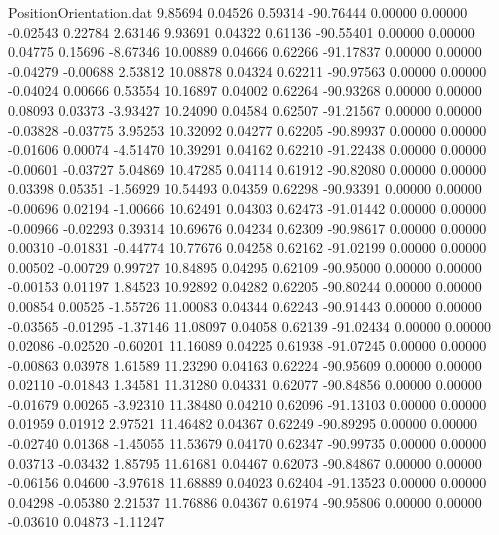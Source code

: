 \begin{filecontents}{PositionOrientation.dat}
   9.85694    0.04526    0.59314   -90.76444    0.00000    0.00000   -0.02543    0.22784    2.63146
   9.93691    0.04322    0.61136   -90.55401    0.00000    0.00000    0.04775    0.15696   -8.67346
  10.00889    0.04666    0.62266   -91.17837    0.00000    0.00000   -0.04279   -0.00688    2.53812
  10.08878    0.04324    0.62211   -90.97563    0.00000    0.00000   -0.04024    0.00666    0.53554
  10.16897    0.04002    0.62264   -90.93268    0.00000    0.00000    0.08093    0.03373   -3.93427
  10.24090    0.04584    0.62507   -91.21567    0.00000    0.00000   -0.03828   -0.03775    3.95253
  10.32092    0.04277    0.62205   -90.89937    0.00000    0.00000   -0.01606    0.00074   -4.51470
  10.39291    0.04162    0.62210   -91.22438    0.00000    0.00000   -0.00601   -0.03727    5.04869
  10.47285    0.04114    0.61912   -90.82080    0.00000    0.00000    0.03398    0.05351   -1.56929
  10.54493    0.04359    0.62298   -90.93391    0.00000    0.00000   -0.00696    0.02194   -1.00666
  10.62491    0.04303    0.62473   -91.01442    0.00000    0.00000   -0.00966   -0.02293    0.39314
  10.69676    0.04234    0.62309   -90.98617    0.00000    0.00000    0.00310   -0.01831   -0.44774
  10.77676    0.04258    0.62162   -91.02199    0.00000    0.00000    0.00502   -0.00729    0.99727
  10.84895    0.04295    0.62109   -90.95000    0.00000    0.00000   -0.00153    0.01197    1.84523
  10.92892    0.04282    0.62205   -90.80244    0.00000    0.00000    0.00854    0.00525   -1.55726
  11.00083    0.04344    0.62243   -90.91443    0.00000    0.00000   -0.03565   -0.01295   -1.37146
  11.08097    0.04058    0.62139   -91.02434    0.00000    0.00000    0.02086   -0.02520   -0.60201
  11.16089    0.04225    0.61938   -91.07245    0.00000    0.00000   -0.00863    0.03978    1.61589
  11.23290    0.04163    0.62224   -90.95609    0.00000    0.00000    0.02110   -0.01843    1.34581
  11.31280    0.04331    0.62077   -90.84856    0.00000    0.00000   -0.01679    0.00265   -3.92310
  11.38480    0.04210    0.62096   -91.13103    0.00000    0.00000    0.01959    0.01912    2.97521
  11.46482    0.04367    0.62249   -90.89295    0.00000    0.00000   -0.02740    0.01368   -1.45055
  11.53679    0.04170    0.62347   -90.99735    0.00000    0.00000    0.03713   -0.03432    1.85795
  11.61681    0.04467    0.62073   -90.84867    0.00000    0.00000   -0.06156    0.04600   -3.97618
  11.68889    0.04023    0.62404   -91.13523    0.00000    0.00000    0.04298   -0.05380    2.21537
  11.76886    0.04367    0.61974   -90.95806    0.00000    0.00000   -0.03610    0.04873   -1.11247

\end{filecontents}
